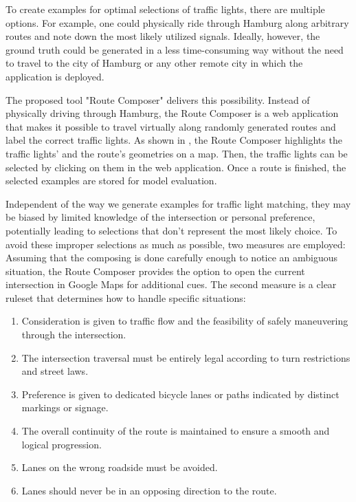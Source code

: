 To create examples for optimal selections of traffic lights, there are multiple options. For example, one could physically ride through Hamburg along arbitrary routes and note down the most likely utilized signals. Ideally, however, the ground truth could be generated in a less time-consuming way without the need to travel to the city of Hamburg or any other remote city in which the application is deployed. 

The proposed tool "Route Composer" delivers this possibility. Instead of physically driving through Hamburg, the Route Composer is a web application that makes it possible to travel virtually along randomly generated routes and label the correct traffic lights. As shown in , the Route Composer highlights the traffic lights' and the route's geometries on a map. Then, the traffic lights can be selected by clicking on them in the web application. Once a route is finished, the selected examples are stored for model evaluation.

Independent of the way we generate examples for traffic light matching, they may be biased by limited knowledge of the intersection or personal preference, potentially leading to selections that don't represent the most likely choice. To avoid these improper selections as much as possible, two measures are employed: Assuming that the composing is done carefully enough to notice an ambiguous situation, the Route Composer provides the option to open the current intersection in Google Maps for additional cues. The second measure is a clear ruleset that determines how to handle specific situations:

\begin{enumerate}
\item Consideration is given to traffic flow and the feasibility of safely maneuvering through the intersection.
\item The intersection traversal must be entirely legal according to turn restrictions and street laws.
\item Preference is given to dedicated bicycle lanes or paths indicated by distinct markings or signage.
\item The overall continuity of the route is maintained to ensure a smooth and logical progression.
\item Lanes on the wrong roadside must be avoided.
\item Lanes should never be in an opposing direction to the route.
\end{enumerate}

